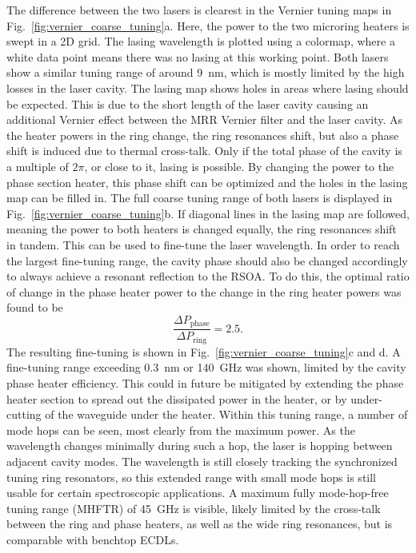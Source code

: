 \documentclass[%
 reprint,
 amsmath,amssymb,
 aps,
]{revtex4-2}
\begin{document}
The difference between the two lasers is clearest in the Vernier tuning maps in Fig.~\ref{fig:vernier_coarse_tuning}a. Here, the power to the two microring heaters is swept in a 2D grid. The lasing wavelength is plotted using a colormap, where a white data point means there was no lasing at this working point. Both lasers show a similar tuning range of around 9~nm, which is mostly limited by the high losses in the laser cavity. The lasing map shows holes in areas where lasing should be expected. This is due to the short length of the laser cavity causing an additional Vernier effect between the MRR Vernier filter and the laser cavity. As the heater powers in the ring change, the ring resonances shift, but also a phase shift is induced due to thermal cross-talk. Only if the total phase of the cavity is a multiple of $2\pi$, or close to it, lasing is possible. By changing the power to the phase section heater, this phase shift can be optimized and the holes in the lasing map can be filled in. The full coarse tuning range of both lasers is displayed in Fig.~\ref{fig:vernier_coarse_tuning}b.
If diagonal lines in the lasing map are followed, meaning the power to both heaters is changed equally, the ring resonances shift in tandem. This can be used to fine-tune the laser wavelength. In order to reach the largest fine-tuning range, the cavity phase should also be changed accordingly to always achieve a resonant reflection to the RSOA. To do this, the optimal ratio of change in the phase heater power to the change in the ring heater powers was found to be
\begin{equation}
    \frac{\Delta P_{\mathrm{phase}}}{\Delta P_{\mathrm{ring}}}= 2.5.
\end{equation}
The resulting fine-tuning is shown in Fig.~\ref{fig:vernier_coarse_tuning}c and d. A fine-tuning range exceeding 0.3~nm or 140~GHz was shown, limited by the cavity phase heater efficiency. This could in future be mitigated by extending the phase heater section to spread out the dissipated power in the heater, or by under-cutting of the waveguide under the heater. Within this tuning range, a number of mode hops can be seen, most clearly from the maximum power. As the wavelength changes minimally during such a hop, the laser is hopping between adjacent cavity modes. The wavelength is still closely tracking the synchronized tuning ring resonators, so this extended range with small mode hops is still usable for certain spectroscopic applications. A maximum fully mode-hop-free tuning range (MHFTR) of 45~GHz is visible, likely limited by the cross-talk between the ring and phase heaters, as well as the wide ring resonances, but is comparable with benchtop ECDLs. 
\end{document}
